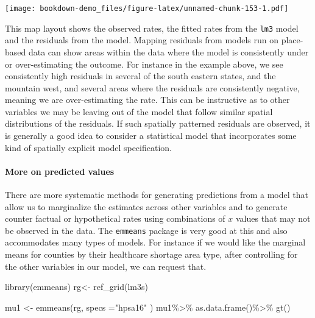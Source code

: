 \documentclass[
]{article}
\newenvironment{Shaded}{\begin{snugshade}}{\end{snugshade}}
\newcommand{\AttributeTok}[1]{\textcolor[rgb]{0.77,0.63,0.00}{#1}}
\newcommand{\FunctionTok}[1]{\textcolor[rgb]{0.00,0.00,0.00}{#1}}
\newcommand{\NormalTok}[1]{#1}
\newcommand{\OtherTok}[1]{\textcolor[rgb]{0.56,0.35,0.01}{#1}}
\newcommand{\SpecialCharTok}[1]{\textcolor[rgb]{0.00,0.00,0.00}{#1}}
\newcommand{\StringTok}[1]{\textcolor[rgb]{0.31,0.60,0.02}{#1}}
\begin{document}
\texttt{[image: bookdown-demo\_files/figure-latex/unnamed-chunk-153-1.pdf]}

This map layout shows the observed rates, the fitted rates from the \texttt{lm3} model and the residuals from the model. Mapping residuals from models run on place-based data can show areas within the data where the model is consistently under or over-estimating the outcome. For instance in the example above, we see consistently high residuals in several of the south eastern states, and the mountain west, and several areas where the residuals are consistently negative, meaning we are over-estimating the rate. This can be instructive as to other variables we may be leaving out of the model that follow similar spatial distributions of the residuals. If such spatially patterned residuals are observed, it is generally a good idea to consider a statistical model that incorporates some kind of spatially explicit model specification.

\hypertarget{more-on-predicted-values}{%
\paragraph{More on predicted values}\label{more-on-predicted-values}}

There are more systematic methods for generating predictions from a model that allow us to marginalize the estimates across other variables and to generate counter factual or hypothetical rates using combinations of \(x\) values that may not be observed in the data. The \texttt{emmeans} package is very good at this and also accommodates many types of models. For instance if we would like the marginal means for counties by their healthcare shortage area type, after controlling for the other variables in our model, we can request that.

\begin{Shaded}
\begin{Highlighting}[]
\FunctionTok{library}\NormalTok{(emmeans)}
\NormalTok{rg}\OtherTok{\textless{}{-}} \FunctionTok{ref\_grid}\NormalTok{(lm3s)}

\NormalTok{mu1 }\OtherTok{\textless{}{-}} \FunctionTok{emmeans}\NormalTok{(rg, }\AttributeTok{specs =}\StringTok{"hpsa16"}\NormalTok{ )}
\NormalTok{mu1}\SpecialCharTok{\%\textgreater{}\%}
  \FunctionTok{as.data.frame}\NormalTok{()}\SpecialCharTok{\%\textgreater{}\%}
  \FunctionTok{gt}\NormalTok{()}
\end{Highlighting}
\end{Shaded}
\end{document}
